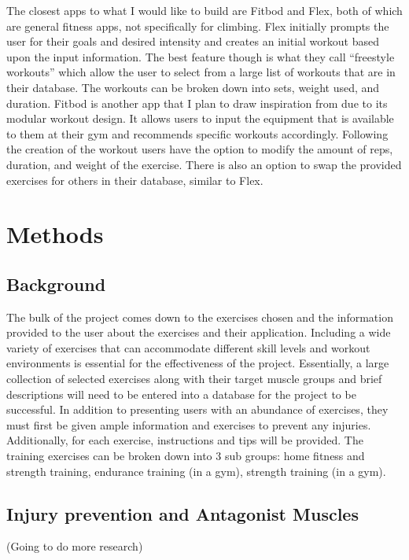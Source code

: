 \documentclass[10pt,twocolumn]{article}
\begin{document}
	The closest apps to what I would like to build are Fitbod and Flex, both of which are general fitness apps, not specifically for climbing. Flex initially prompts the user for their goals and desired intensity and creates an initial workout based upon the input information. The best feature though is what they call “freestyle workouts” which allow the user to select from a large list of workouts that are in their database. The workouts can be broken down into sets, weight used, and duration. Fitbod is another app that I plan to draw inspiration from due to its modular workout design. It allows users to input the equipment that is available to them at their gym and recommends specific workouts accordingly. Following the creation of the workout users have the option to modify the amount of reps, duration, and weight of the exercise. There is also an option to swap the provided exercises for others in their database, similar to Flex.

\section{Methods}


\subsection{Background}
	
	The bulk of the project comes down to the exercises chosen and the information provided to the user about the exercises and their application. Including a wide variety of exercises that can accommodate different skill levels and workout environments is essential for the effectiveness of the project. Essentially, a large collection of selected exercises along with their target muscle groups and brief descriptions will need to be entered into a database for the project to be successful. In addition to presenting users with an abundance of exercises, they must first be given ample information and exercises to prevent any injuries. Additionally, for each exercise, instructions and tips will be provided. The training exercises can be broken down into 3 sub groups: home fitness and strength training, endurance training (in a gym), strength training (in a gym). 
	
\subsection{Injury prevention and Antagonist Muscles}

	(Going to do more research)
	
\end{document}
